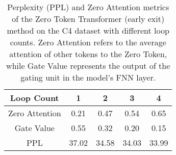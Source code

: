 \renewcommand{\arraystretch}{1.1}
\begin{table}[]
\centering
\small  %
\caption{
Perplexity (PPL) and Zero Attention metrics of the Zero Token Transformer (early exit) method on the C4 dataset with different loop counts. Zero Attention refers to the average attention of other tokens to the Zero Token, while Gate Value represents the output of the gating unit in the model's FNN layer.
}
\vspace{-0.4cm}
\label{tab:attention}
\begin{tabular}{c|cccc}
\hline
 
\textbf{Loop Count} & \textbf{1} & \textbf{2} & \textbf{3} & \textbf{4} \\ \hline
Zero Attention      & 0.21       & 0.47       & 0.54       & 0.65       \\ \hline
Gate Value          & 0.55       & 0.32       & 0.20       & 0.15       \\ \hline
PPL                 & 37.02      & 34.58      & 34.03      & 33.99      \\ \hline
\end{tabular}
 \vspace{-0.96cm}
\end{table}
